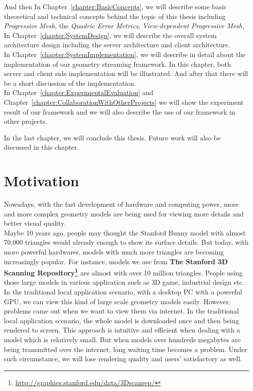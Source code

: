 And then In Chapter~\ref{chapter:BasicConcepts}, we will describe some basic theoretical and technical concepts behind the topic of this thesis including \emph{Progressive Mesh}, the \emph{Quadric Error Metrics}, \emph{View-dependent Progressive Mesh}, \etc \\

In Chapter~\ref{chapter:SystemDesign}, we will describe the overall system architecture design including the server architecture and client architecture. \\

In Chapter~\ref{chapter:SystemImplementation}, we will describe in detail about the implementation of our geometry streaming framework. In this chapter, both server and client side implementation will be illustrated. And after that there will be a short discussion of the implementation. \\

In Chapter~\ref{chapter:ExperimentalEvaluation} and Chapter~\ref{chapter:CollaborationWithOtherProjects} we will show the experiment result of our framework and we will also describe the use of our framework in other projects. 

In the last chapter, we will conclude this thesis. Future work will also be discussed in this chapter. 

\section{Motivation}
\label{section:motivation}

Nowadays, with the fast development of hardware and computing power, more and more complex geometry models are being used for viewing more details and better visual quality. \\

Maybe 10 years ago, people may thought the Stanford Bunny model with almost 70,000 triangles would already enough to show its surface details. But today, with more powerful hardwares, models with much more triangles are becoming increasingly popular. For instance, models we use from \textbf{The Stanford 3D Scanning Repository\footnote{\label{S3DSR}\url{http://graphics.stanford.edu/data/3Dscanrep/}}} are almost with over 10 million triangles. People using those large models in various application such as 3D game, industrial design etc.\\

In the traditional local application scenario, with a desktop PC with a powerful GPU, we can view this kind of large scale geometry models easily. However, problems came out when we want to view them via internet. In the traditional local application scenario, the whole model is downloaded once and then being rendered to screen. This approach is intuitive and efficient when dealing with a model which is relatively small. But when models over hundreds megabytes are being transmitted over the internet, long waiting time becomes a problem. Under such circumstance, we will lose rendering quality and users' satisfactory as well. \\

